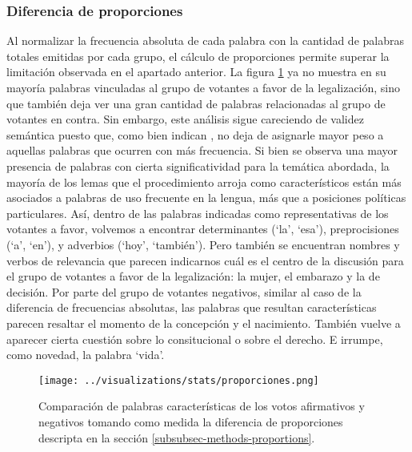 \subsubsection{Diferencia de proporciones}
\label{subsubsec-results-proporcions}
Al normalizar la frecuencia absoluta de cada palabra con la cantidad
de palabras totales emitidas por cada grupo, el cálculo de proporciones permite
superar la limitación observada en el apartado anterior.
La figura \ref{fig-statistics-proportions} ya no muestra en su mayoría palabras
vinculadas al grupo de votantes a favor de la legalización, sino que también
deja ver una gran cantidad de palabras relacionadas al grupo de votantes en contra.
Sin embargo, este análisis sigue careciendo de validez semántica puesto que, como bien
indican \cite{monroe2008fightin}, no deja de asignarle mayor peso a aquellas palabras
que ocurren con más frecuencia. Si bien se observa una mayor presencia de palabras
con cierta significatividad para la temática abordada, la mayoría de los lemas
que el procedimiento arroja como característicos están más asociados a palabras
de uso frecuente en la lengua, más que a posiciones políticas particulares. Así,
dentro de las palabras indicadas como representativas de los votantes a favor,
volvemos a encontrar determinantes (`la', `esa'), preprocisiones (`a', `en'),
y adverbios (`hoy', `también'). Pero también se encuentran nombres y verbos
de relevancia que parecen indicarnos cuál es el centro de la discusión para el
grupo de votantes a favor de la legalización: la mujer, el embarazo y la
de decisión. Por parte del grupo de votantes negativos, similar al caso de
la diferencia de frecuencias absolutas, las palabras que resultan
características parecen resaltar  el momento de la concepción y el nacimiento.
También vuelve a aparecer cierta cuestión sobre lo consitucional o sobre el derecho.
E irrumpe, como novedad, la palabra `vida'.

\begin{figure}[h!]
    \centering
    \texttt{[image: ../visualizations/stats/proporciones.png]}
    \caption{Comparación de palabras características de los votos afirmativos y
    negativos tomando como medida la diferencia de proporciones descripta
    en la sección \ref{subsubsec-methods-proportions}.}
    \label{fig-statistics-proportions}
\end{figure}

